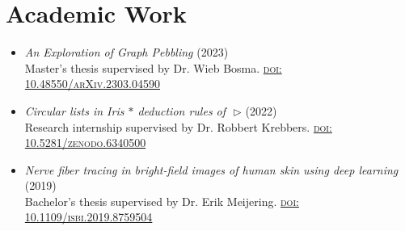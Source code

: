 \documentclass[a4paper,12pt]{article}
\begin{document}
\section*{Academic Work}

\begin{itemize}[--,labelsep=3mm,leftmargin=*]
\item \emph{An Exploration of Graph Pebbling} (2023)\\
Master's thesis supervised by Dr. Wieb Bosma. \textsc{\href{https://arxiv.org/abs/2303.04590}{doi: 10.48550/arXiv.2303.04590}}
\item \emph{Circular lists in Iris $\ast$ deduction rules of~\,$\triangleright$} (2022)\\
Research internship supervised by Dr. Robbert Krebbers. \textsc{\href{https://doi.org/10.5281/zenodo.6340500}{doi: 10.5281/zenodo.6340500}}
\item \emph{Nerve fiber tracing in bright-field images of human skin using deep learning} (2019)\\
Bachelor's thesis supervised by Dr. Erik Meijering. \textsc{\href{https://ieeexplore.ieee.org/document/8759504}{doi: 10.1109/isbi.2019.8759504}}
\end{itemize}
\end{document}
